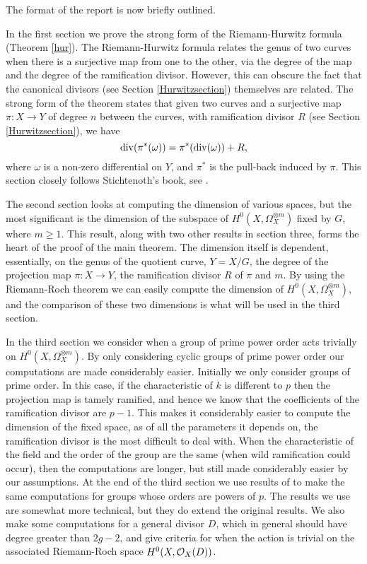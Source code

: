   The format of the report is now briefly outlined.
  
  In the first section we prove the strong form of the Riemann-Hurwitz formula (Theorem \ref{hur}).
  The Riemann-Hurwitz formula relates the genus of two curves when there is a surjective map from one to the other, via the degree of the map and the degree of the ramification divisor.
  However, this can obscure the fact that the canonical divisors (see Section \ref{Hurwitzsection}) themselves are related.
  The strong form of the theorem states that given two curves and a surjective map $\pi:X\rightarrow Y$ of degree $n$ between the curves, with ramification divisor $R$ (see Section \ref{Hurwitzsection}), we have
  \[
 \operatorname{div} (\pi^* (\omega)) = \pi^*(\operatorname{div} (\omega)) + R,
  \]
where $\omega$ is a non-zero differential on $Y$, and $\pi^*$ is the pull-back induced by $\pi$.
This section closely follows Stichtenoth's book, see \cite{stichtenoth}.

The second section looks at computing the dimension of various spaces, but the most significant is the dimension of the subspace of $H^0(X,\Omega_X^{\otimes m})$ fixed by $G$, where $m\geq 1$.
This result, along with two other results in section three, forms the heart of the proof of the main theorem.
The dimension itself is dependent, essentially, on the genus of the quotient curve, $Y=X/G$, the degree of the projection map $\pi:X\rightarrow Y$, the ramification divisor $R$ of $\pi$ and $m$.
By using the Riemann-Roch theorem we can easily compute the dimension of $H^0(X,\Omega_X^{\otimes m})$, and the comparison of these two dimensions is what will be used in the third section.


In the third section we consider when a group of prime power order acts trivially on $H^0(X,\Omega_X^{\otimes m})$.
By only considering cyclic groups of prime power order our computations are made considerably easier.
Initially we only consider groups of prime order.
In this case, if the characteristic of $k$ is different to $p$ then the projection map is tamely ramified, and hence we know that the coefficients of the ramification divisor are $p-1$.
This makes it considerably easier to compute the dimension of the fixed space, as of all the parameters it depends on, the ramification divisor is the most difficult to deal with.
When the characteristic of the field and the order of the group are the same (\ie when wild ramification could occur), then the computations are longer, but still made considerably easier by our assumptions.
At the end of the third section we use results of \cite{kako} to make the same computations for groups whose orders are powers of $p$.
The results we use are somewhat more technical, but they do extend the original results.
We also make some computations for a general divisor $D$, which in general should have degree greater than $2g-2$, and give criteria for when the action is trivial on the associated Riemann-Roch space $H^0(X,{\cal O}_X(D))$.

